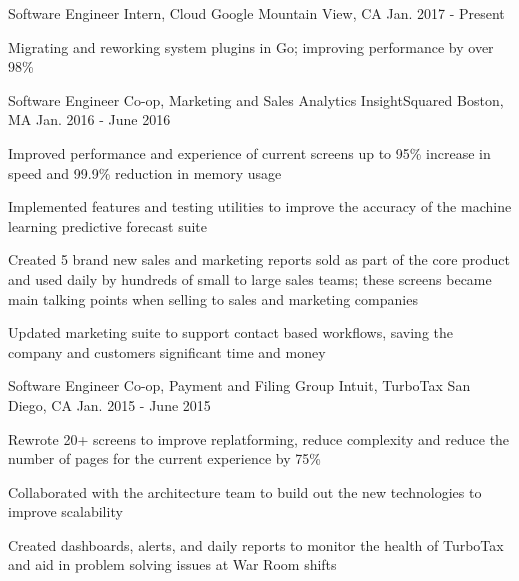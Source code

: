 

\begin{cventries}

  \cventry
    {Software Engineer Intern, Cloud} %
    {Google} %
    {Mountain View, CA} %
    {Jan. 2017 - Present} %
    {
      \begin{cvitems} %
        \item {Migrating and reworking system plugins in Go; improving performance by over 98\%}
      \end{cvitems}
    }

  \cventry
    {Software Engineer Co-op, Marketing and Sales Analytics} %
    {InsightSquared} %
    {Boston, MA} %
    {Jan. 2016 - June 2016} %
    {
      \begin{cvitems} %
        \item {Improved performance and experience of current screens up to 95\% increase in speed and 99.9\% reduction in memory usage}
        \item {Implemented features and testing utilities to improve the accuracy of the machine learning predictive forecast suite}
        \item {Created 5 brand new sales and marketing reports sold as part of the core product and used daily by hundreds of small to large sales teams; these screens became main talking points when selling to sales and marketing companies}
        \item {Updated marketing suite to support contact based workflows, saving the company and customers significant time and money}
      \end{cvitems}
    }

  \cventry
    {Software Engineer Co-op, Payment and Filing Group} %
    {Intuit, TurboTax} %
    {San Diego, CA} %
    {Jan. 2015 - June 2015} %
    {
      \begin{cvitems} %
        \item {Rewrote 20+ screens to improve replatforming, reduce complexity and reduce the number of pages for the current experience by 75\%}
        \item {Collaborated with the architecture team to build out the new technologies to improve scalability}
        \item {Created dashboards, alerts, and daily reports to monitor the health of TurboTax and aid in problem solving issues at War Room shifts}
      \end{cvitems}
    }


\end{cventries}
